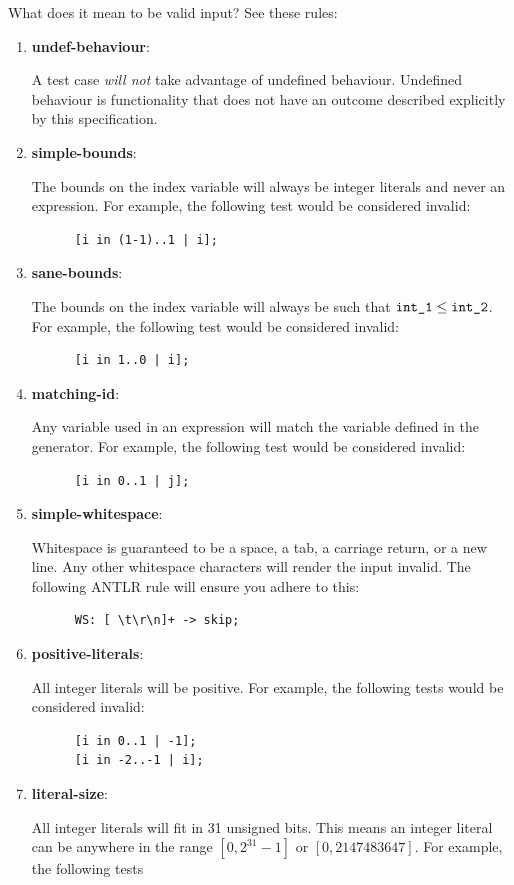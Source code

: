 \documentclass{article}
\newcommand{\code}[1]{\texttt{\textmd{#1}}}
\newcommand{\assertiondest}[1]{\hypertarget{#1}{\textbf{#1}:}}
\begin{document}
What does it mean to be valid input? See these rules:
\begin{enumerate}
  \item
    \assertiondest{undef-behaviour}
    A test case \textit{will not} take advantage of undefined behaviour. Undefined behaviour is
    functionality that does not have an outcome described explicitly by this specification.
  \item
    \assertiondest{simple-bounds}
    The bounds on the index variable will always be integer literals and never an expression. For
    example, the following test would be considered invalid:
    \begin{lstlisting}
      [i in (1-1)..1 | i];
    \end{lstlisting}
  \item
    \assertiondest{sane-bounds}
    The bounds on the index variable will always be such that $\code{int\_1} \leq
    \code{int\_2}$. For example, the following test would be considered invalid:
    \begin{lstlisting}
      [i in 1..0 | i];
    \end{lstlisting}
  \item
    \assertiondest{matching-id}
    Any variable used in an expression will match the variable defined in the generator. For
    example, the following test would be considered invalid:
    \begin{lstlisting}
      [i in 0..1 | j];
    \end{lstlisting}
  \item
    \assertiondest{simple-whitespace}
    Whitespace is guaranteed to be a space, a tab, a carriage return, or a new
    line. Any other whitespace characters will render the input invalid. The following ANTLR rule
    will ensure you adhere to this:
    \begin{lstlisting}
      WS: [ \t\r\n]+ -> skip;
    \end{lstlisting}
  \item
    \assertiondest{positive-literals}
    All integer literals will be positive. For example, the following tests would be considered
    invalid:
    \begin{lstlisting}
      [i in 0..1 | -1];
      [i in -2..-1 | i];
    \end{lstlisting}
  \item
    \assertiondest{literal-size}
    All integer literals will fit in 31 unsigned bits. This means an integer literal can be
    anywhere in the range $[0, 2^{31} - 1]$ or $[0, 2147483647]$. For example, the following tests

\end{enumerate}
\end{document}
